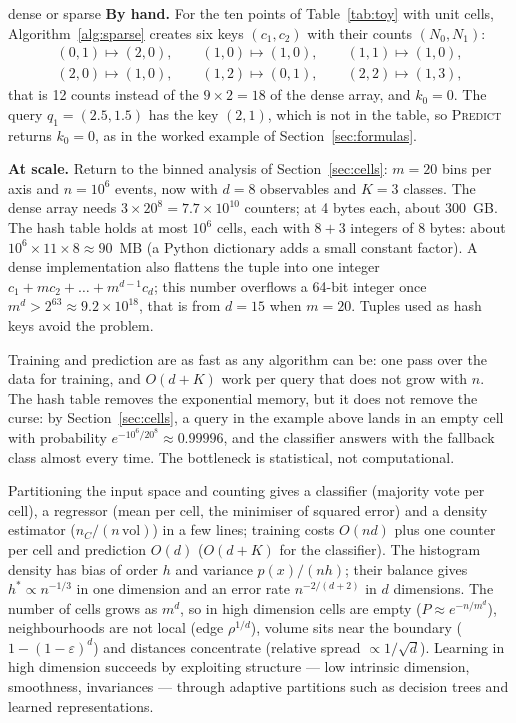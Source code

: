 \documentclass[11pt]{article}
\begin{document}
\begin{worked}{dense or sparse}
\textbf{By hand.} For the ten points of Table~\ref{tab:toy} with unit cells, Algorithm~\ref{alg:sparse} creates six
keys $(c_1, c_2)$ with their counts $(N_0, N_1)$:
\[
  \begin{gathered}
  (0,1) \mapsto (2,0), \qquad (1,0) \mapsto (1,0), \qquad (1,1) \mapsto (1,0), \\
  (2,0) \mapsto (1,0), \qquad (1,2) \mapsto (0,1), \qquad (2,2) \mapsto (1,3),
  \end{gathered}
\]
that is 12 counts instead of the $9 \times 2 = 18$ of the dense array, and $k_0 = 0$. The query $q_1 = (2.5, 1.5)$ has
the key $(2, 1)$, which is not in the table, so \textsc{Predict} returns $k_0 = 0$, as in the worked example of
Section~\ref{sec:formulas}.

\textbf{At scale.} Return to the binned analysis of Section~\ref{sec:cells}: $m = 20$ bins per axis and $n = 10^6$ events, now with
$d = 8$ observables and $K = 3$ classes. The dense array needs $3 \times 20^8 = 7.7 \times 10^{10}$ counters; at
4 bytes each, about 300~GB. The hash table holds at most $10^6$ cells, each with $8 + 3$ integers of 8 bytes: about
$10^6 \times 11 \times 8 \approx 90$~MB (a Python dictionary adds a small constant factor). A dense implementation
also flattens the tuple into one integer $c_1 + m c_2 + \dots + m^{d-1} c_d$; this number overflows a 64-bit integer
once $m^d > 2^{63} \approx 9.2 \times 10^{18}$, that is from $d = 15$ when $m = 20$. Tuples used as hash keys avoid
the problem.
\end{worked}

Training and prediction are as fast as any algorithm can be: one pass over the data for training, and $O(d + K)$
work per query that does not grow with $n$. The hash table removes the exponential memory, but it does not remove the
curse: by Section~\ref{sec:cells}, a query in the example above lands in an empty cell with probability
$e^{-10^6/20^8} \approx 0.99996$, and the classifier answers with the fallback class almost every time. The bottleneck is statistical, not computational.

\begin{keyidea}[Summary]
Partitioning the input space and counting gives a classifier (majority vote per cell), a regressor (mean per cell,
the minimiser of squared error) and a density estimator ($n_C/(n\,\mathrm{vol})$) in a few lines; training costs
$O(nd)$ plus one counter per cell and prediction $O(d)$ ($O(d + K)$ for the classifier). The histogram density has bias of order $h$ and variance
$p(x)/(nh)$; their balance gives $h^* \propto n^{-1/3}$ in one dimension and an error rate $n^{-2/(d+2)}$ in $d$
dimensions. The number of cells grows as $m^d$, so in high dimension cells are empty ($P \approx e^{-n/m^d}$),
neighbourhoods are not local (edge $\rho^{1/d}$), volume sits near the boundary ($1 - (1 - \varepsilon)^d$) and
distances concentrate (relative spread $\propto 1/\sqrt d$). Learning in high dimension succeeds by exploiting
structure --- low intrinsic dimension, smoothness, invariances --- through adaptive partitions such as decision trees
and learned representations.
\end{keyidea}
\end{document}
